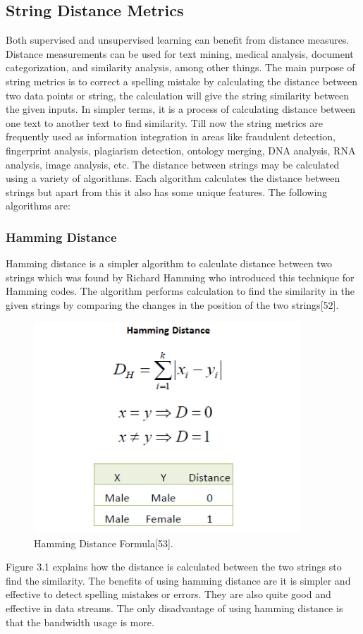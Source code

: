 \subsection{String Distance Metrics}
Both supervised and unsupervised learning can benefit from distance measures. Distance measurements can be used for text mining, medical analysis, document categorization, and similarity analysis, among other things. The main purpose of string metrics is to correct a spelling mistake by calculating the distance between two data points or string, the calculation will give the string similarity between the given inputs. In simpler terms, it is a process of calculating distance between one text to another text to find similarity. Till now the string metrics are frequently used as information integration in areas like fraudulent detection, fingerprint analysis, plagiarism detection, ontology merging, DNA analysis, RNA analysis, image analysis, etc. The distance between strings may be calculated using a variety of algorithms. Each algorithm calculates the distance between strings but apart from this it also has some unique features. The following algorithms are:
\subsubsection{Hamming Distance}
Hamming distance is a simpler algorithm to calculate distance between two strings which was found by Richard Hamming who introduced this technique for Hamming codes. The algorithm performs  calculation to find the similarity in the given strings by comparing the changes in the position of the two strings[52].

\begin{figure}[h!]
	\includegraphics[width=10cm]{includes/hamming.png}
	\centering
	\caption{ Hamming Distance Formula[53].}
	\label{fig:hamming}
\end{figure}
Figure 3.1 explains how the distance is calculated between the two strings sto find the similarity. The benefits of using hamming distance are it is simpler and effective to detect spelling mistakes or errors. They are also quite good and effective in data streams. The only disadvantage of using hamming distance is that the bandwidth usage is more.
